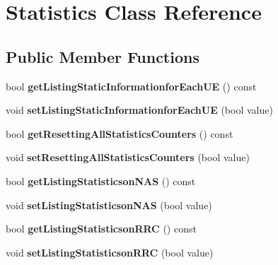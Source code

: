 \hypertarget{class_statistics}{}\section{Statistics Class Reference}
\label{class_statistics}
\subsection*{Public Member Functions}
\begin{DoxyCompactItemize}
\item 
bool {\bfseries get\+Listing\+Static\+Informationfor\+Each\+UE} () const \hypertarget{class_statistics_a89f46691119990b4d548d181a6bca9e4}{}\label{class_statistics_a89f46691119990b4d548d181a6bca9e4}

\item 
void {\bfseries set\+Listing\+Static\+Informationfor\+Each\+UE} (bool value)\hypertarget{class_statistics_ad6189e870bbf7ae49b001b4e715fbee5}{}\label{class_statistics_ad6189e870bbf7ae49b001b4e715fbee5}

\item 
bool {\bfseries get\+Resetting\+All\+Statistics\+Counters} () const \hypertarget{class_statistics_a1216abfd20b33bf13f889dded50f9f30}{}\label{class_statistics_a1216abfd20b33bf13f889dded50f9f30}

\item 
void {\bfseries set\+Resetting\+All\+Statistics\+Counters} (bool value)\hypertarget{class_statistics_a579a4a98a201d477a3a6366535c1914e}{}\label{class_statistics_a579a4a98a201d477a3a6366535c1914e}

\item 
bool {\bfseries get\+Listing\+Statisticson\+N\+AS} () const \hypertarget{class_statistics_a1d56e7a0679e97a3d6831810d99bda5f}{}\label{class_statistics_a1d56e7a0679e97a3d6831810d99bda5f}

\item 
void {\bfseries set\+Listing\+Statisticson\+N\+AS} (bool value)\hypertarget{class_statistics_a12e96911525fe5bc772fe2acf8088a54}{}\label{class_statistics_a12e96911525fe5bc772fe2acf8088a54}

\item 
bool {\bfseries get\+Listing\+Statisticson\+R\+RC} () const \hypertarget{class_statistics_afeedf22b0d7ddb759846a9e3fc2de53d}{}\label{class_statistics_afeedf22b0d7ddb759846a9e3fc2de53d}

\item 
void {\bfseries set\+Listing\+Statisticson\+R\+RC} (bool value)\hypertarget{class_statistics_a6fd2d86eef1c752961292cfbffdecf56}{}\label{class_statistics_a6fd2d86eef1c752961292cfbffdecf56}


\end{DoxyCompactItemize}
